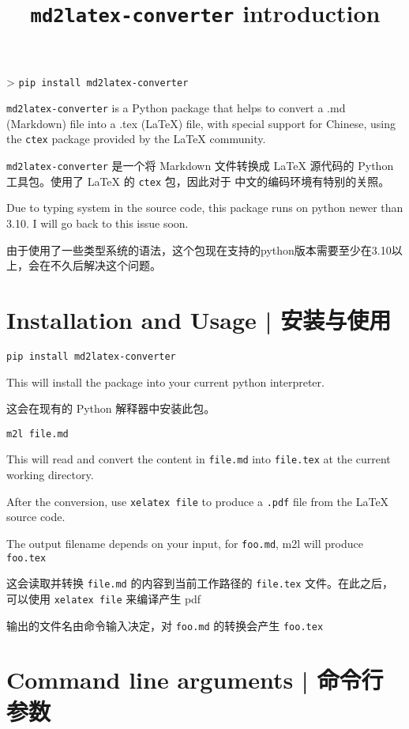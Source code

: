 \documentclass{ctexart}
\title{\texttt{md2latex-converter} introduction }
\begin{document}
	\maketitle

	> \texttt{pip install md2latex-converter}

	\texttt{md2latex-converter} is a Python package that helps to convert a .md (Markdown) file into a .tex (LaTeX) file, with special support for Chinese, using the \texttt{ctex} package provided by the LaTeX community.

	\texttt{md2latex-converter} 是一个将 Markdown 文件转换成 LaTeX 源代码的 Python 工具包。使用了 LaTeX 的 \texttt{ctex} 包，因此对于 中文的编码环境有特别的关照。

	Due to typing system in the source code, this package runs on python newer than 3.10. I will go back to this issue soon.

	由于使用了一些类型系统的语法，这个包现在支持的python版本需要至少在3.10以上，会在不久后解决这个问题。

	\section{Installation and Usage | 安装与使用}

	\texttt{pip install md2latex-converter}

	This will install the package into your current python interpreter.

	这会在现有的 Python 解释器中安装此包。

	\texttt{m2l file.md}

	This will read and convert the content in \texttt{file.md} into \texttt{file.tex} at the current working directory.

	After the conversion, use \texttt{xelatex file} to produce a \texttt{.pdf} file from the LaTeX source code.

	The output filename depends on your input, for \texttt{foo.md}, m2l will produce \texttt{foo.tex}

	这会读取并转换 \texttt{file.md} 的内容到当前工作路径的 \texttt{file.tex} 文件。在此之后，可以使用 \texttt{xelatex file} 来编译产生 pdf

	输出的文件名由命令输入决定，对 \texttt{foo.md} 的转换会产生 \texttt{foo.tex}

	\section{Command line arguments | 命令行参数}
\end{document}
